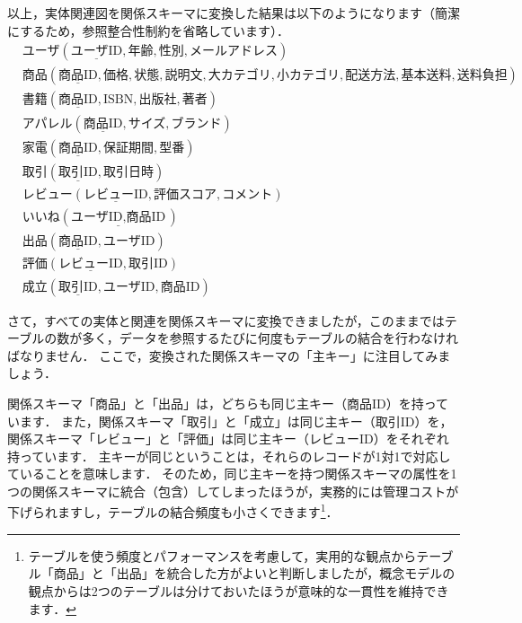 以上，実体関連図を関係スキーマに変換した結果は以下のようになります（簡潔にするため，参照整合性制約を省略しています）．
\begin{align}
&\textbf{ユーザ}(\underline{\text{ユーザID}}, \text{年齢}, \text{性別}, \text{メールアドレス}) \\
&\textbf{商品}(\underline{\text{商品ID}}, \text{価格}, \text{状態}, \text{説明文}, \text{大カテゴリ}, \text{小カテゴリ}, \text{配送方法}, \text{基本送料}, \text{送料負担}) \\
&\textbf{書籍}(\underline{\text{商品ID}}, \text{ISBN}, \text{出版社}, \text{著者}) \\
&\textbf{アパレル}(\underline{\text{商品ID}}, \text{サイズ}, \text{ブランド}) \\
&\textbf{家電}(\underline{\text{商品ID}}, \text{保証期間}, \text{型番}) \\
&\textbf{取引}(\underline{\text{取引ID}}, \text{取引日時}) \\
&\textbf{レビュー}(\underline{\text{レビューID}}, \text{評価スコア}, \text{コメント}) \\
&\textbf{いいね}(\underline{\text{ユーザID}, \text{商品ID}}) \\
&\textbf{出品}(\underline{\text{商品ID}}, \text{ユーザID}) \\
&\textbf{評価}(\underline{\text{レビューID}}, \text{取引ID}) \\
&\textbf{成立}(\underline{\text{取引ID}}, \text{ユーザID}, \text{商品ID})
\end{align}

さて，すべての実体と関連を関係スキーマに変換できましたが，このままではテーブルの数が多く，データを参照するたびに何度もテーブルの結合を行わなければなりません．
ここで，変換された関係スキーマの「主キー」に注目してみましょう．

関係スキーマ「商品」と「出品」は，どちらも同じ主キー（商品ID）を持っています．
また，関係スキーマ「取引」と「成立」は同じ主キー（取引ID）を，関係スキーマ「レビュー」と「評価」は同じ主キー（レビューID）をそれぞれ持っています．
主キーが同じということは，それらのレコードが1対1で対応していることを意味します．
そのため，同じ主キーを持つ関係スキーマの属性を1つの関係スキーマに統合（包含）してしまったほうが，実務的には管理コストが下げられますし，テーブルの結合頻度も小さくできます\footnote{テーブルを使う頻度とパフォーマンスを考慮して，実用的な観点からテーブル「商品」と「出品」を統合した方がよいと判断しましたが，概念モデルの観点からは2つのテーブルは分けておいたほうが意味的な一貫性を維持できます．}．

